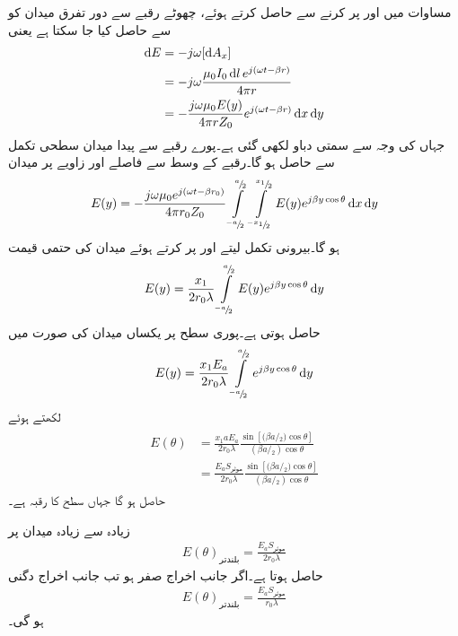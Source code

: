 مساوات  میں  اور  پر کرنے  سے  حاصل کرتے ہوئے، چھوٹے رقبے   سے دور تفرق میدان کو  سے حاصل کیا جا سکتا ہے یعنی
\begin{gather}
\begin{aligned}
\dif E &=-j \omega [\dif A_x] \\
&=-j \omega \frac{\mu_0 I_0 \dif l \, e^{j(\omega t -\beta r)}}{4\pi r}  \\
&=-\frac{j \omega \mu_0 E(y)}{4\pi r Z_0} e^{j(\omega t-\beta r)} \dif x \dif y
\end{aligned}
\end{gather}
جہاں  کی وجہ سے  سمتی دباو لکھی گئی ہے۔پورے رقبے  سے پیدا میدان سطحی تکمل سے حاصل ہو گا۔رقبے کے وسط سے  فاصلے اور  زاویے پر میدان
\begin{align}
E(y)=-\frac{j \omega \mu_0 e^{j(\omega t-\beta r_0)}}{4\pi r_0 Z_0} \int \limits_{^{-a}\!/\!_2}^{^a\!/\!_2} \int \limits_{^{-x_1}\!/\!_2}^{^{x_1}\!/\!_2} E(y) e^{j\beta y \cos \theta} \dif x \dif y
\end{align}
ہو گا۔بیرونی تکمل لیتے اور  پر کرتے ہوئے  میدان کی حتمی قیمت 
\begin{align}
E(y)=\frac{x_1}{2 r_0 \lambda} \int \limits_{^{-a}\!/\!_2}^{^a\!/\!_2}  E(y) e^{j\beta y \cos \theta} \dif y
\end{align}
حاصل ہوتی ہے۔پوری سطح پر یکساں میدان  کی صورت میں
\begin{align}
E(y)=\frac{x_1 E_a}{2 r_0 \lambda} \int \limits_{^{-a}\!/\!_2}^{^a\!/\!_2}  e^{j\beta y \cos \theta} \dif y
\end{align}
لکھتے ہوئے
\begin{gather}
\begin{aligned}\label{مساوات_اینٹینا_سطحی_دور_میدان}
E(\theta)&=\frac{x_1 a E_a }{2 r_0 \lambda} \frac{\sin [{(\beta a}\!/\!_2)\cos \theta ]}{({\beta a}\!/\!_2)\cos \theta}\\
&=\frac{E_a S_{\text{موثر}}}{2 r_0 \lambda} \frac{\sin [{(\beta a}\!/\!_2)\cos \theta ]}{({\beta a}\!/\!_2)\cos \theta}
\end{aligned}
\end{gather}
حاصل ہو گا جہاں  سطح کا رقبہ ہے۔

زیادہ سے زیادہ میدان  پر 
\begin{align}\label{مساوات_اینٹینا_سطحی_دور_میدان_الف}
E(\theta)_{\text{بلندتر}}=\frac{E_a S_{\text{موثر}}}{2 r_0 \lambda}
\end{align}
حاصل ہوتا ہے۔اگر  جانب اخراج صفر ہو تب  جانب اخراج دگنی
\begin{align}\label{مساوات_اینٹینا_سطحی_دور_میدان_ب}
E(\theta)_{\text{بلندتر}}=\frac{E_a S_{\text{موثر}}}{r_0 \lambda}
\end{align}
 ہو گی۔

